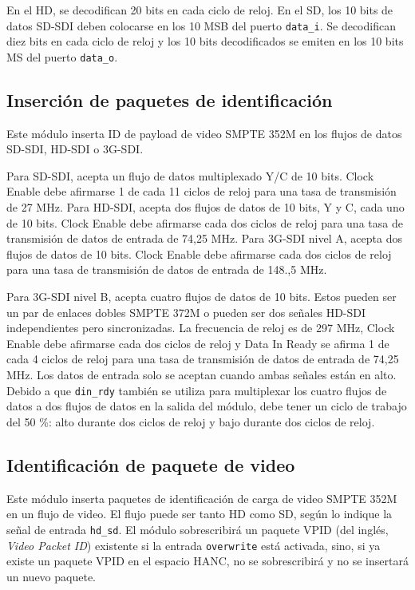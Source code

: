 En el HD, se decodifican 20 bits en cada ciclo de reloj. En el SD, los 10 bits
de datos SD-SDI deben colocarse en los 10 MSB del puerto \texttt{data\_i}. Se
decodifican diez bits en cada ciclo de reloj y los 10 bits decodificados se
emiten en los 10 bits MS del puerto \texttt{data\_o}.

\subsection{Inserción de paquetes de identificación}

Este módulo inserta ID de payload de video SMPTE 352M en los flujos de datos
SD-SDI, HD-SDI o 3G-SDI\@.

Para SD-SDI, acepta un flujo de datos multiplexado Y/C de 10 bits. Clock Enable
debe afirmarse 1 de cada 11 ciclos de reloj para una tasa de transmisión de 27
MHz. Para HD-SDI, acepta dos flujos de datos de 10 bits, Y y C, cada uno de
10 bits. Clock Enable debe afirmarse cada dos ciclos de reloj para una tasa de
transmisión de datos de entrada de 74,25 MHz. Para 3G-SDI nivel A, acepta dos
flujos de datos de 10 bits. Clock Enable debe afirmarse cada dos ciclos de
reloj para una tasa de transmisión de datos de entrada de 148.,5 MHz.

Para 3G-SDI nivel B, acepta cuatro flujos de datos de 10 bits. Estos pueden ser
un par de enlaces dobles SMPTE 372M o pueden ser dos señales HD-SDI
independientes pero sincronizadas. La frecuencia de reloj es de 297 MHz,
Clock Enable debe afirmarse cada dos ciclos de reloj y Data In Ready se
afirma 1 de cada 4 ciclos de reloj para una tasa de transmisión de datos de
entrada de 74,25 MHz. Los datos de entrada solo se aceptan cuando ambas
señales están en alto. Debido a que \texttt{din\_rdy} también se utiliza para
multiplexar los cuatro flujos de datos a dos flujos de datos en la salida del
módulo, debe tener un ciclo de trabajo del 50 \%: alto durante dos ciclos de
reloj y bajo durante dos ciclos de reloj.

\subsection{Identificación de paquete de video}

Este módulo inserta paquetes de identificación de carga de video SMPTE 352M~\citep{st352} en
un flujo de video. El flujo puede ser tanto HD como SD, según lo indique la
señal de entrada \texttt{hd\_sd}. El módulo sobrescribirá un paquete VPID  (del inglés, \textit{Video Packet ID}) existente si la
entrada \texttt{overwrite} está activada, sino, si ya existe un paquete VPID en
el espacio HANC, no se sobrescribirá y no se insertará un nuevo paquete.

